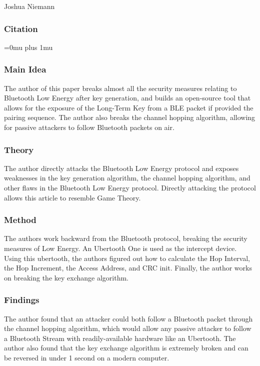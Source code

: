 \noindent
Joshua Niemann

\noindent
\subsubsection{Citation}

\Urlmuskip=0mu plus 1mu\relax

\subsubsection{Main Idea}

\noindent
The author of this paper breaks almost all the security measures relating to Bluetooth Low Energy after key generation, and builds an open-source tool that allows for the exposure of the Long-Term Key from a BLE packet if provided the pairing sequence.  The author also breaks the channel hopping algorithm, allowing for passive attackers to follow Bluetooth packets on air.

\subsubsection{Theory}

\noindent
The author directly attacks the Bluetooth Low Energy protocol and exposes weaknesses in the key generation algorithm, the channel hopping algorithm, and other flaws in the Bluetooth Low Energy protocol.  Directly attacking the protocol allows this article to resemble Game Theory.

\subsubsection{Method}

\noindent
The authors work backward from the Bluetooth protocol, breaking the security measures of Low Energy.  An Ubertooth One is used as the intercept device.  Using this ubertooth, the authors figured out how to calculate the Hop Interval, the Hop Increment, the Access Address, and CRC init.  Finally, the author works on breaking the key exchange algorithm.

\subsubsection{Findings}

\noindent
The author found that an attacker could both follow a Bluetooth packet through the channel hopping algorithm, which would allow any passive attacker to follow a Bluetooth Stream with readily-available hardware like an Ubertooth.  The author also found that the key exchange algorithm is extremely broken and can be reversed in under 1 second on a modern computer.


